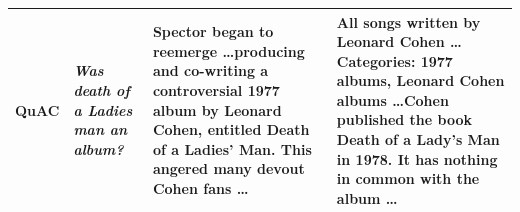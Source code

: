\begin{table}[ht]
\begin{tabularx}{\textwidth}{p{1.6cm} p{3.2cm} X X}
\textbf{QuAC} & 
\textit{Was death of a Ladies man an album?} & 
Spector began to reemerge \dots producing and co-writing a controversial 1977 \textbf{album by Leonard Cohen, entitled Death of a Ladies' Man}. This angered many devout Cohen fans \dots & 
 All songs written by Leonard Cohen \dots Categories: \textbf{1977 albums}, Leonard Cohen albums \dots Cohen published the book Death of a Lady's Man in 1978. It has nothing in common with the album \dots \\

\bottomrule
\end{tabularx}
\label{tab:case_stud}
\end{table}